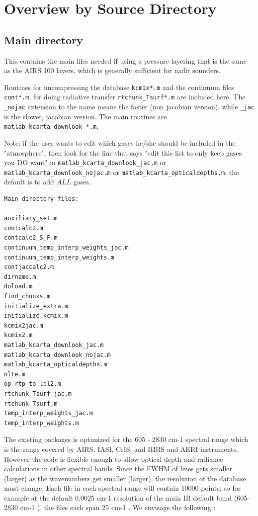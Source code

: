 \documentclass[11pt]{article}
\newcommand{\wn}{cm-1 }
\begin{document}
\section{Overview by Source Directory}

\subsection{Main directory}
This contains the main files needed if using a pressure layering that
is the same as the AIRS 100 layers, which is generally sufficient for
nadir sounders.

Routines for uncompressing the database \texttt{kcmix*.m} and the
continuum files \texttt{cont*.m}, for doing radiative transfer
\texttt{rtchunk\_Tsurf*.m} are included here. The \texttt{\_nojac}
extension to the name means the faster (non jacobian version), while
\texttt{\_jac} is the slower, jacobian version. The main routines are
\texttt{matlab\_kcarta\_downlook\_*.m}.

Note: if the user wants to edit which gases he/she should be included
in the "atmosphere", then look for the line that says "edit this list
to only keep gases you DO want" in
\texttt{matlab\_kcarta\_downlook\_jac.m} or
\texttt{matlab\_kcarta\_downlook\_nojac.m} or
\texttt{matlab\_kcarta\_opticaldepths.m}; the default is to add $ALL$
gases.

\begin{small}
\begin{verbatim}
Main directory files:

auxiliary_set.m
contcalc2.m
contcalc2_S_F.m
continuum_temp_interp_weights_jac.m
continuum_temp_interp_weights.m
contjaccalc2.m
dirname.m
doload.m
find_chunks.m
initialize_extra.m
initialize_kcmix.m
kcmix2jac.m
kcmix2.m
matlab_kcarta_downlook_jac.m
matlab_kcarta_downlook_nojac.m
matlab_kcarta_opticaldepths.m
nlte.m
op_rtp_to_lbl2.m
rtchunk_Tsurf_jac.m
rtchunk_Tsurf.m
temp_interp_weights_jac.m
temp_interp_weights.m
\end{verbatim}
\end{small}

The existing packages is optimized for the 605 - 2830 \wn spectral
range which is the range covered by AIRS, IASI, CrIS, and HIRS and
AERI instruments. However the code is flexible enough to allow optical
depth and radiance calculations in other spectral bands. Since the
FWHM of lines gets smaller (larger) as the wavenumbers get smaller
(larger), the resolution of the database must change.  Each file in
each spectral range will contain 10000 points; so for example at the
default 0.0025 \wn resolution of the main IR default band (605-2830
\wn), the files each span 25 \wn. We envisage the following :
\end{document}
